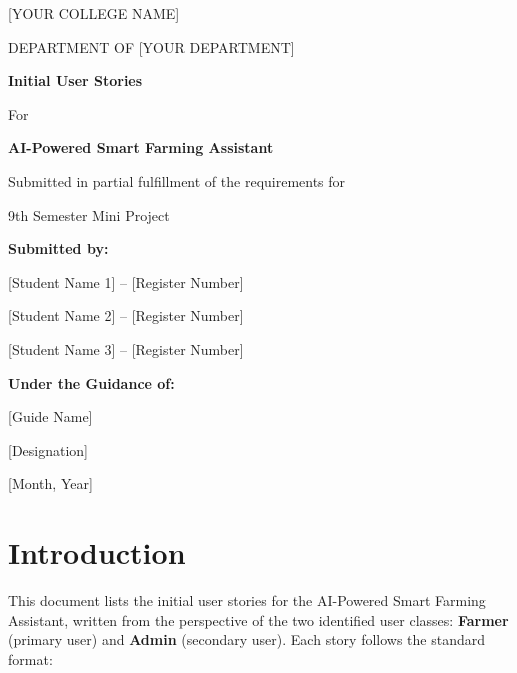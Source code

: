 \documentclass[12pt,a4paper]{article}
\begin{document}
\begin{titlepage}
    \centering
    \vspace*{1cm}
    {\large [YOUR COLLEGE NAME]\par}
    {\large DEPARTMENT OF [YOUR DEPARTMENT]\par}
    \vspace{2cm}
    {\Huge\bfseries Initial User Stories\par}
    \vspace{0.5cm}
    {\Large For\par}
    \vspace{0.5cm}
    {\Large\bfseries AI-Powered Smart Farming Assistant\par}
    \vspace{2cm}
    {\large Submitted in partial fulfillment of the requirements for\par}
    {\large 9th Semester Mini Project\par}
    \vspace{2cm}
    {\large\bfseries Submitted by:\par}
    \vspace{0.3cm}
    {\large [Student Name 1] -- [Register Number]\par}
    {\large [Student Name 2] -- [Register Number]\par}
    {\large [Student Name 3] -- [Register Number]\par}
    \vspace{2cm}
    {\large\bfseries Under the Guidance of:\par}
    \vspace{0.3cm}
    {\large [Guide Name]\par}
    {\large [Designation]\par}
    \vfill
    {\large [Month, Year]\par}
\end{titlepage}

\tableofcontents
\newpage

\section{Introduction}
This document lists the initial user stories for the AI-Powered Smart Farming Assistant, written from the perspective of the two identified user classes: \textbf{Farmer} (primary user) and \textbf{Admin} (secondary user). Each story follows the standard format:
\end{document}
